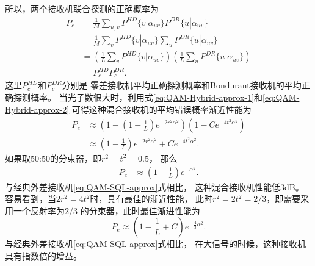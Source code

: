 所以，两个接收机联合探测的正确概率为
\begin{equation}
\begin{split}
P_c &= \frac{1}{M} \sum_{u,v} P^{HD}\{v| \alpha_{uv}\} P^{DR}\{u|\alpha_{uv}\} \\
    &= \frac{1}{M} \sum_v P^{HD}\{v| \alpha_{uv}\} \sum_u P^{DR}\{u|\alpha_{uv}\} \\
    &= \left( \frac{1}{L} \sum_v P^{HD}\{v| \alpha_{uv}\} \right) \left( \frac{1}{L} \sum_u P^{DR}\{u|\alpha_{uv}\} \right) \\
    &= P_c^{HD} P_c^{DR}.
\end{split}
\end{equation}
这里$P_c^{HD}$和$P_c^{DR}$分别是
零差接收机平均正确探测概率和Bondurant接收机的平均正确探测概率。
当光子数很大时，利用式\ref{eq:QAM-Hybrid-approx-1}和\ref{eq:QAM-Hybrid-approx-2}
可得这种混合接收机的平均错误概率渐近性能为
\begin{equation}
\begin{split}
P_e & \approx \left(1 - (1-\frac{1}{L}) e^{-2r^2\alpha^2} \right) \left( 1 - C e^{-4t^2\alpha^2} \right)  \\
    & \approx (1-\frac{1}{L}) e^{-2r^2\alpha^2} +C e^{-4t^2\alpha^2} .
\end{split}
\end{equation}
如果取50:50的分束器，即$r^2 = t^2 = 0.5$，
那么
\begin{equation}
\begin{split}
P_e & \approx (1-\frac{1}{L}) e^{-\alpha^2}  .
\end{split}
\end{equation}
与经典外差接收机\ref{eq:QAM-SQL-approx}式相比，
这种混合接收机性能低3dB。
容易看到，当$2r^2 = 4t^2$时，具有最佳的渐近性能，
此时$r^2 = 2 t^2 = 2/3$，即需要采用一个反射率为$2/3$
的分束器，此时最佳渐进性能为
\begin{equation}
P_e \approx (1-\frac{1}{L}+C) e^{-\frac{4}{3}\alpha^2}  .
\end{equation}
与经典外差接收机\ref{eq:QAM-SQL-approx}式相比，
在大信号的时候，这种接收机具有指数倍的增益。




